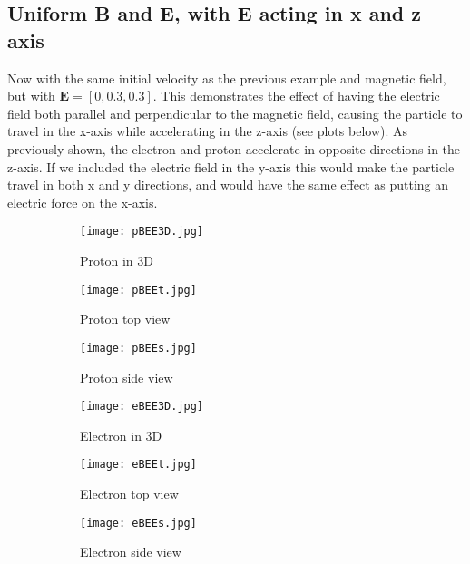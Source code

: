 \documentclass[14paper,11pt,hidelinks]{article}
\begin{document}
\subsection{ Uniform B and E,  with E acting in x and z axis}
Now with the same initial velocity as the previous example and magnetic field, but with \begin{math} \mathbf{E}=[0,0.3,0.3] \end{math}. This demonstrates the effect of having the electric field both parallel and perpendicular to the magnetic field, causing the particle to travel in the x-axis while accelerating in the z-axis (see plots below). As previously shown, the electron and proton accelerate in opposite directions in the z-axis. If we included the electric field in the y-axis this would make the particle travel in both x and y directions, and would have the same effect as putting an electric force on the x-axis. 
\newline
\begin{figure}[h!]
\centering
\begin{subfigure}[b]{0.3\linewidth}
\texttt{[image: pBEE3D.jpg]} 
\caption*{Proton in 3D}
\end{subfigure}
\begin{subfigure}[b]{0.3\linewidth}
\texttt{[image: pBEEt.jpg]}
\caption*{Proton top view}
\end{subfigure}
\begin{subfigure}[b]{0.3\linewidth}
\texttt{[image: pBEEs.jpg]}
\caption*{Proton side view}
\end{subfigure}
\caption{}
\end{figure}
\begin{figure}[h!]
\centering
\begin{subfigure}[b]{0.3\linewidth}
\texttt{[image: eBEE3D.jpg]} 
\caption*{Electron in 3D}
\end{subfigure}
\begin{subfigure}[b]{0.3\linewidth}
\texttt{[image: eBEEt.jpg]}
\caption*{Electron top view}
\end{subfigure}
\begin{subfigure}[b]{0.3\linewidth}
\texttt{[image: eBEEs.jpg]}
\caption*{Electron side view}
\end{subfigure}
\caption{}
\end{figure}
\newline
\FloatBarrier


\end{document}
